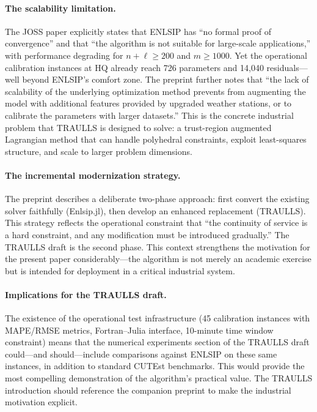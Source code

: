 \documentclass[11pt]{article}
\theoremstyle{plain}
\begin{document}
\paragraph{The scalability limitation.} The JOSS paper explicitly states that ENLSIP has ``no formal proof of convergence'' and that ``the algorithm is not suitable for large-scale applications,'' with performance degrading for $n + \ell \ge 200$ and $m \ge 1000$. Yet the operational calibration instances at HQ already reach 726 parameters and 14,040 residuals---well beyond ENLSIP's comfort zone. The preprint further notes that ``the lack of scalability of the underlying optimization method prevents from augmenting the model with additional features provided by upgraded weather stations, or to calibrate the parameters with larger datasets.'' This is the concrete industrial problem that TRAULLS is designed to solve: a trust-region augmented Lagrangian method that can handle polyhedral constraints, exploit least-squares structure, and scale to larger problem dimensions.

\paragraph{The incremental modernization strategy.} The preprint describes a deliberate two-phase approach: first convert the existing solver faithfully (Enlsip.jl), then develop an enhanced replacement (TRAULLS). This strategy reflects the operational constraint that ``the continuity of service is a hard constraint, and any modification must be introduced gradually.'' The TRAULLS draft is the second phase. This context strengthens the motivation for the present paper considerably---the algorithm is not merely an academic exercise but is intended for deployment in a critical industrial system.

\paragraph{Implications for the TRAULLS draft.} The existence of the operational test infrastructure (45 calibration instances with MAPE/RMSE metrics, Fortran--Julia interface, 10-minute time window constraint) means that the numerical experiments section of the TRAULLS draft could---and should---include comparisons against ENLSIP on these same instances, in addition to standard CUTEst benchmarks. This would provide the most compelling demonstration of the algorithm's practical value. The TRAULLS introduction should reference the companion preprint to make the industrial motivation explicit.
\end{document}
